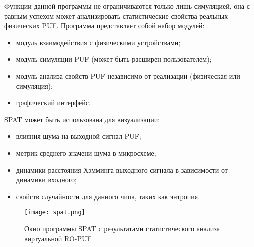 Функции данной программы не ограничиваются только лишь симуляцией, она с равным успехом может анализировать статистические свойства реальных физических PUF.
Программа представляет собой набор модулей:
\begin{itemize}
  \item модуль взаимодействия с физическими устройствами;
  \item модуль симуляции PUF (может быть расширен пользователем);
  \item модуль анализа свойств PUF независимо от реализации (физическая или симуляция);
  \item графический интерфейс.
\end{itemize}
SPAT может быть использована для визуализации:
\begin{itemize}
  \item влияния шума на выходной сигнал PUF;
  \item метрик среднего значени шума в микросхеме;
  \item динамики расстояния Хэмминга выходного сигнала в зависимости от динамики входного;
  \item свойств случайности для данного чипа, таких как энтропия.
\end{itemize}
\begin{figure}[ht]
    \centering
    \texttt{[image: spat.png]}
    \caption{Окно программы SPAT с результатами статистического анализа виртуальной RO-PUF}
    \label{fig:techs:spat}
\end{figure}
